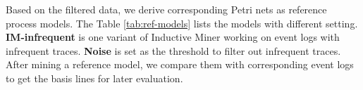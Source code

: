Based on the filtered data, we derive corresponding Petri nets as reference process models. The Table \ref{tab:ref-models} lists the models with different setting. \textbf{IM-infrequent} is one variant of Inductive Miner working on event logs with infrequent traces. \textbf{Noise} is set as the threshold to filter out infrequent traces. After mining a reference model, we compare them with  corresponding event logs to get the basis lines for later evaluation.
\begin{table}[h]
	\caption{Generated reference models for test}
	\label{tab:ref-models}
\end{table}
